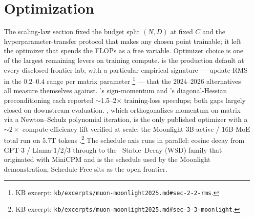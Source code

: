 
\section{Optimization}
\label{sec:optimization}

The scaling-law section fixed the budget split $(N, D)$ at fixed $C$
and the hyperparameter-transfer protocol that makes any chosen point
trainable; it left the optimizer that spends the FLOPs as a free
variable. Optimizer choice is one of the largest remaining levers on
training compute.  is the production default at every disclosed
frontier lab, with a particular empirical signature
--- update-RMS in the $0.2$--$0.4$ range per matrix parameter
\citep[\S 2.2]{muon-moonlight2025}\footnote{KB excerpt:
\nolinkurl{kb/excerpts/muon-moonlight2025.md#sec-2-2-rms}.} --- that the
2024--2026 alternatives all measure themselves against. 's
sign-momentum and 's diagonal-Hessian preconditioning each
reported $\sim$1.5--2$\times$ training-loss speedups; both gaps largely
closed on downstream evaluation.   \citep{muon-moonlight2025},
which orthogonalizes momentum on matrix  via a Newton--Schulz
polynomial iteration, is the only published optimizer with a
$\sim\!2\times$ compute-efficiency lift verified at  scale: the
Moonlight 3B-active / 16B-MoE total run on $5.7$T tokens
\citep[\S 3.3]{muon-moonlight2025}.\footnote{KB excerpt:
\nolinkurl{kb/excerpts/muon-moonlight2025.md#sec-3-3-moonlight}.} The
schedule axis runs in parallel: cosine decay from GPT-3 / Llama-1/2/3
through to the --Stable--Decay (WSD) family that originated with
MiniCPM \citep{phi4} and is the schedule used by the Moonlight 
demonstration. Schedule-Free \citep[ICML
2024]{muon-moonlight2025} sits as the open frontier.

